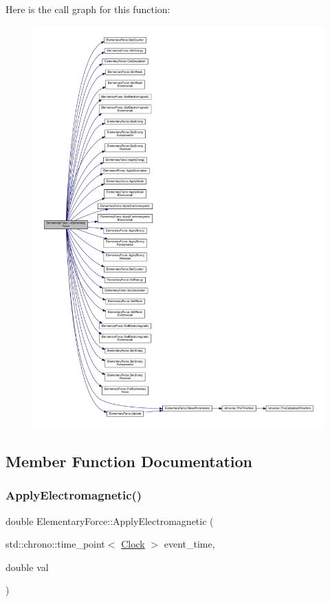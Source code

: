 Here is the call graph for this function\+:
\nopagebreak
\begin{figure}[H]
\begin{center}
\leavevmode
\includegraphics[width=350pt]{class_elementary_force_afee0c87be3bd2a5221c9fcaddd70dfa6_cgraph}
\end{center}
\end{figure}


\subsection{Member Function Documentation}
\mbox{\label{class_elementary_force_a0045a3380e468c6cfdbefce829888c1f}} 
\subsubsection{\texorpdfstring{Apply\+Electromagnetic()}{ApplyElectromagnetic()}}
{\footnotesize\ttfamily double Elementary\+Force\+::\+Apply\+Electromagnetic (\begin{DoxyParamCaption}\item[{std\+::chrono\+::time\+\_\+point$<$ \hyperlink{universe_8h_a0ef8d951d1ca5ab3cfaf7ab4c7a6fd80}{Clock} $>$}]{event\+\_\+time,  }\item[{double}]{val }\end{DoxyParamCaption})\hspace{0.3cm}{\ttfamily [virtual]}}



